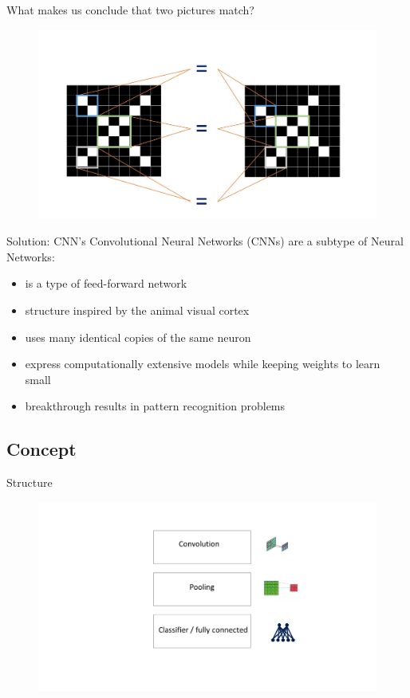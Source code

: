\documentclass[12pt]{beamer}
\begin{document}
\begin{frame}{What makes us conclude that two pictures match?}
\begin{figure}
\includegraphics[width = 0.8\linewidth]{images/features.jpg}
\label{fig:principle}
\end{figure}
\end{frame}



\begin{frame}{Solution: CNN's}
Convolutional Neural Networks (CNNs) are a subtype of Neural Networks:
  \begin{itemize}
  	\item is a type of feed-forward network
  	\item structure inspired by the animal visual cortex
     \item uses many identical copies of the same neuron
     \item express computationally extensive models while keeping weights to learn small
     \item breakthrough results in pattern recognition problems
     
  \end{itemize}
\end{frame}

\subsection{Concept}

\begin{frame}{Structure}
\begin{figure}
\includegraphics[width = 1\linewidth]{images/struct.jpg}
\label{fig:principle}
\end{figure}
\end{frame}
\end{document}
